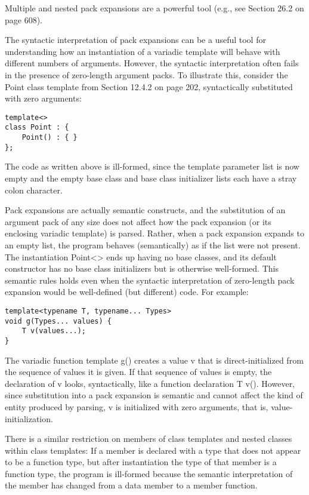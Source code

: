 Multiple and nested pack expansions are a powerful tool (e.g., see Section 26.2 on page 608).



The syntactic interpretation of pack expansions can be a useful tool for understanding how an instantiation of a variadic template will behave with different numbers of arguments. However, the syntactic interpretation often fails in the presence of zero-length argument packs. To illustrate this, consider the Point class template from Section 12.4.2 on page 202, syntactically substituted with zero arguments:

\begin{lstlisting}[style=styleCXX]
template<>
class Point : {
	Point() : { }
};
\end{lstlisting}

The code as written above is ill-formed, since the template  parameter list is now empty and the empty base class and base class initializer lists each have a stray colon character.

Pack expansions are actually semantic constructs, and the substitution of an argument pack of any size does not affect how the pack expansion (or its enclosing variadic template) is parsed. Rather, when a pack expansion expands to an empty list, the program behaves (semantically) as if the list were not present. The instantiation Point<> ends up having no base classes, and its default constructor has no base class initializers but is otherwise well-formed. This semantic rules holds even when the syntactic interpretation of zero-length pack expansion would be well-defined (but different) code. For example:

\begin{lstlisting}[style=styleCXX]
template<typename T, typename... Types>
void g(Types... values) {
	T v(values...);
}
\end{lstlisting}

The variadic function template g() creates a value v that is direct-initialized from the sequence of values it is given. If that sequence of values is empty, the declaration of v looks, syntactically, like a function declaration T v(). However, since substitution into a pack expansion is semantic and cannot affect the kind of entity produced by parsing, v is initialized with zero arguments, that is, value-initialization.

\begin{tcolorbox}[colback=webgreen!5!white,colframe=webgreen!75!black]
\hspace*{0.75cm}There is a similar restriction on members of class templates and nested classes within class templates: If a member is declared with a type that does not appear to be a function type, but after instantiation the type of that member is a function type, the program is ill-formed because the semantic interpretation of the member has changed from a data member to a member function.
\end{tcolorbox}

